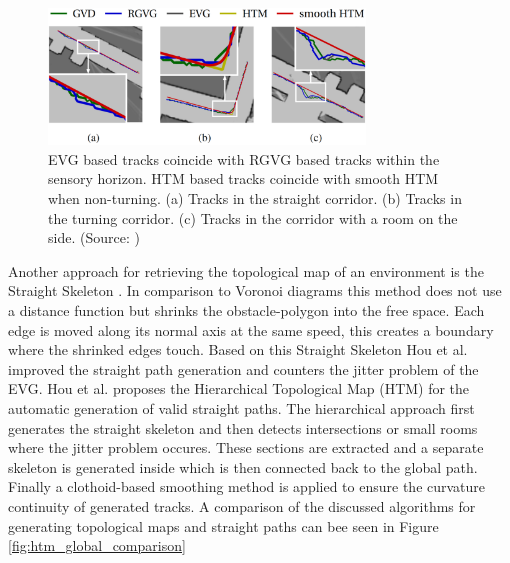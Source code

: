 \begin{figure}[h]
    \centering
    \includegraphics[width=0.75\textwidth]{figures/20_state_of_the_art/htm_path_comparison.png}
    \caption[Comparison between straight paths]{EVG based tracks coincide with RGVG based tracks within the sensory horizon. HTM based tracks coincide with smooth HTM when non-turning. (a) Tracks in the straight corridor. (b) Tracks in the turning corridor. (c) Tracks in the corridor with a room on the side. (Source: \cite{hou_straight_2021})}
    \label{fig:htm_path_comparison}
\end{figure}

Another approach for retrieving the topological map of an environment is the Straight Skeleton \cite{maurer_novel_1996}. In comparison to Voronoi diagrams this method does not use a distance function but shrinks the obstacle-polygon into the free space. Each edge is moved along its normal axis at the same speed, this creates a boundary where the shrinked edges touch. Based on this Straight Skeleton Hou et al. \cite{hou_straight_2021} improved the straight path generation and counters the jitter problem of the EVG. Hou et al. proposes the Hierarchical Topological Map (HTM) for the automatic generation of valid straight paths. The hierarchical approach first generates the straight skeleton and then detects intersections or small rooms where the jitter problem occures. These sections are extracted and a separate skeleton is generated inside which is then connected back to the global path. Finally a clothoid-based smoothing method is applied to ensure the curvature continuity of generated tracks. A comparison of the discussed algorithms for generating topological maps and straight paths can bee seen in Figure \ref{fig:htm_global_comparison}

